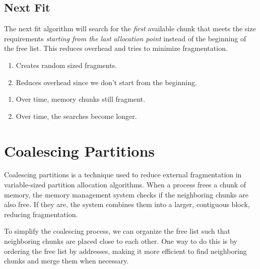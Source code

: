 \documentclass{report}
\newcommand{\bookBegin}[1]{\begin{tcolorbox}[colback=black!5!white,colframe=black!75!black,title={\textit{Operating Systems, Three Easy Pieces: #1}}]}
\newcommand{\bookEnd}{\end{tcolorbox}}
\begin{document}
\subsection{Next Fit}
The next fit algorithm will search for the \textit{first} available chunk that meets the size
requirements \textit{starting from the last allocation point} instead of the beginning of the free
list. This reduces overhead and tries to minimize fragmentation.

\begin{tcbraster}[raster columns=2, raster equal height, raster force size=false]
  \begin{tcolorbox}[colback=green!5!white,colframe=black!75!green,title=Advantages]
    \begin{enumerate}[label=\textit{(\roman*)}]
    \item Creates random sized fragments.
    \item Reduces overhead since we don't start from the beginning.
    \end{enumerate}
  \end{tcolorbox}
  \begin{tcolorbox}[colback=red!5!white,colframe=black!40!red,title=Disadvantages]
    \begin{enumerate}[label=\textit{(\roman*)}]
    \item Over time, memory chunks still fragment.
    \item Over time, the searches become longer.
    \end{enumerate}
  \end{tcolorbox}
\end{tcbraster}


\section{Coalescing Partitions}
Coalescing partitions is a technique used to reduce external fragmentation in variable-sized
partition allocation algorithms. When a process frees a chunk of memory, the memory management
system checks if the neighboring chunks are also free. If they are, the system combines them into a
larger, contiguous block, reducing fragmentation.

\bookBegin{Free-Space Management}
To simplify the coalescing process, we can organize the free list such that neighboring chunks are
placed close to each other. One way to do this is by ordering the free list by addresses, making it
more efficient to find neighboring chunks and merge them when necessary.
\bookEnd
\end{document}
